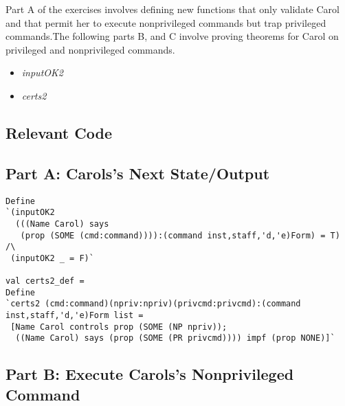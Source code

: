 \documentclass{article}
\begin{document}
Part A of the exercises involves
defining new functions that only validate Carol and 
that permit her to execute nonprivileged commands
but trap privileged commands.The following parts B, 
and C involve proving theorems for Carol on privileged 
and nonprivileged commands.

\begin{itemize}
\item \textit{inputOK2} 
\item \textit{certs2} 
\end{itemize}


\subsection{Relevant Code}
\label{sec:relevant-code-1}

\subsection{Part A: Carols's Next State/Output}
\label{sec:part-a:-carolss}


\HOLSMZeroSolutionsTheoremsinputOKTwoXXdef
\HOLSMZeroSolutionsDefinitionscertsTwoXXdef

\begin{verbatim}
Define
`(inputOK2
  (((Name Carol) says
   (prop (SOME (cmd:command)))):(command inst,staff,'d,'e)Form) = T) /\
 (inputOK2 _ = F)`

val certs2_def =
Define
`certs2 (cmd:command)(npriv:npriv)(privcmd:privcmd):(command inst,staff,'d,'e)Form list =
 [Name Carol controls prop (SOME (NP npriv));
  ((Name Carol) says (prop (SOME (PR privcmd)))) impf (prop NONE)]`
\end{verbatim}


\subsection{Part B: Execute Carols's Nonprivileged Command}
\label{sec:part-b:-execute}


\HOLSMZeroSolutionsTheoremsCarolXXnprivXXlemma
\HOLSMZeroSolutionsTheoremsCarolXXexecXXnprivXXjustifiedXXthm
\HOLSMZeroSolutionsTheoremsCarolXXnprivXXverifiedXXthm
\HOLSMZeroSolutionsTheoremsCarolXXjustifiedXXnprivXXexecXXthm

\end{document}
